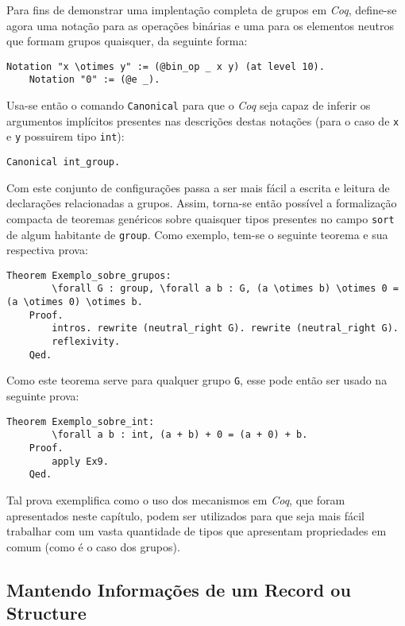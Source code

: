 Para fins de demonstrar uma implentação completa de grupos em \textit{Coq}, define-se agora uma notação para as operações binárias e uma para os elementos neutros que formam grupos quaisquer, da seguinte forma:
\begin{lstlisting}[language = coq]
    Notation "x \otimes y" := (@bin_op _ x y) (at level 10).
    Notation "0" := (@e _).
\end{lstlisting}
Usa-se então o comando \lstinline[language = coq]$Canonical$ para que o \textit{Coq} seja capaz de inferir os argumentos implícitos presentes nas descrições destas notações (para o caso de \lstinline[language = coq]$x$ e  \lstinline[language = coq]$y$ possuirem tipo  \lstinline[language = coq]$int$):
\begin{lstlisting}[language = coq]
    Canonical int_group.
\end{lstlisting}
Com este conjunto de configurações passa a ser mais fácil a escrita e leitura de declarações relacionadas a grupos. Assim, torna-se então possível a formalização compacta de teoremas genéricos sobre quaisquer tipos presentes no campo \lstinline[language = coq]$sort$ de algum habitante de \lstinline[language = coq]$group$. Como exemplo, tem-se o seguinte teorema e sua respectiva prova:
\begin{lstlisting}[language = coq]
    Theorem Exemplo_sobre_grupos: 
        \forall G : group, \forall a b : G, (a \otimes b) \otimes 0 = (a \otimes 0) \otimes b.
    Proof.
        intros. rewrite (neutral_right G). rewrite (neutral_right G).
        reflexivity. 
    Qed.
\end{lstlisting}
Como este teorema serve para qualquer grupo \lstinline[language = coq]$G$, esse pode então ser usado na seguinte prova:
\begin{lstlisting}[language = coq]
    Theorem Exemplo_sobre_int:
        \forall a b : int, (a + b) + 0 = (a + 0) + b.
    Proof.
        apply Ex9.
    Qed.
\end{lstlisting}
Tal prova exemplifica como o uso dos mecanismos em \textit{Coq}, que foram apresentados neste capítulo, podem ser utilizados para que seja mais fácil trabalhar com um vasta quantidade de tipos que apresentam propriedades em comum (como é o caso dos grupos).

\subsection{Mantendo Informações de um Record ou Structure}

